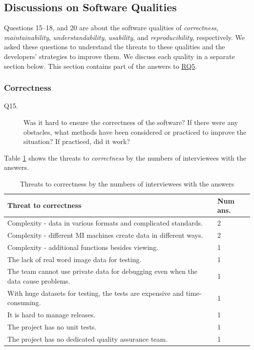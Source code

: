\documentclass[final, 3p, times, authoryear]{elsarticle}
\begin{document}
\subsection{Discussions on Software Qualities} \label{sec_interview_software_qualities}

Questions 15--18, and 20 are about the software qualities of
\textit{correctness}, \textit{maintainability}, \textit{understandability},
\textit{usability}, and \textit{reproducibility}, respectively. We asked these
questions to understand the threats to these qualities and the developers'
strategies to improve them. We discuss each quality in a separate section below.
This section contains part of the answers to \hyperlink{rq5}{RQ5}.

\subsubsection{Correctness} \label{sec_interview_correctness}

\begin{description}
\item[Q15.] Was it hard to ensure the correctness of the software? If there were
any obstacles, what methods have been considered or practiced to improve the
situation? If practiced, did it work?
\end{description}

Table \ref{tab_q15_threats_correctness} shows the threats to
\textit{correctness} by the numbers of interviewees with the answers.

\begin{table}[ht]
\centering
\hspace*{-1cm}\begin{tabular}{ll}
\hline
Threat to correctness & Num ans. \\ \hline
Complexity - data in various formats and complicated standards. & 2 \\
Complexity - different MI machines create data in different ways. & 2 \\
Complexity - additional functions besides viewing. & 1 \\
The lack of real word image data for testing. & 1 \\
The team cannot use private data for debugging even when the data cause
problems. & 1 \\
With huge datasets for testing, the tests are expensive and time-consuming. & 1 \\
It is hard to manage releases. & 1 \\
The project has no unit tests. & 1 \\
The project has no dedicated quality assurance team. & 1 \\ \hline
\end{tabular}
\caption{\label{tab_q15_threats_correctness}Threats to correctness by the
numbers of interviewees with the answers}
\end{table}
\end{document}
